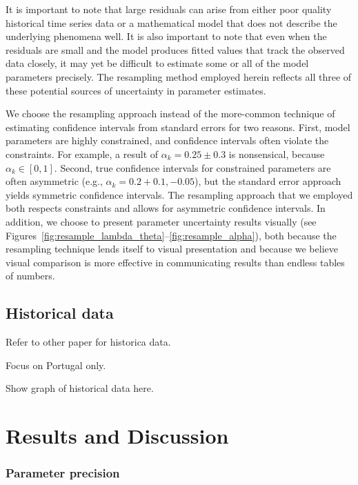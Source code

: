 \documentclass[preprint,10pt,3p]{elsarticle}\usepackage[]{graphicx}\usepackage[]{color}
\begin{document}
It is important to note that large residuals can arise from either
poor quality historical time series data or
a mathematical model that does not describe the underlying phenomena well.
It is also important to note that even when the residuals are small and the
model produces fitted values that track the observed data closely, it may
yet be difficult to estimate some or all of the model parameters precisely.
The resampling method employed herein reflects all three of these potential
sources of uncertainty in parameter estimates.

We choose the resampling approach instead of the more-common technique
of estimating confidence intervals from standard errors for two reasons.
First, model parameters are highly constrained, and confidence intervals often violate the constraints.
For example, a result of $\alpha_k = 0.25 \pm 0.3$ is nonsensical,
because $ \alpha_k \in [0, 1]$.
Second, true confidence intervals for constrained parameters are often asymmetric
(e.g., $\alpha_k = 0.2 + 0.1, -0.05$),
but the standard error approach yields symmetric confidence intervals.
The resampling approach that we employed both respects constraints
and allows for asymmetric confidence intervals.%
In addition, we choose to present parameter uncertainty results visually
(see Figures~\ref{fig:resample_lambda_theta}--\ref{fig:resample_alpha}),
both because the resampling technique lends itself to visual presentation and
because we believe visual comparison is more effective
in communicating results than endless tables of numbers.



\subsection{Historical data}
\label{sec:historical_data}

Refer to other paper for historica data.

Focus on Portugal only.

Show graph of historical data here.



\section{Results and Discussion}
\label{sec:results}

\subsubsection{Parameter precision}
\label{sec:resampling}
\end{document}
